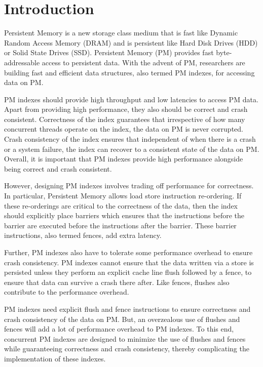 \section{Introduction}

Persistent Memory is a new storage class medium that is fast like Dynamic
Random Access Memory (DRAM) and is persistent like Hard Disk Drives (HDD) or
Solid State Drives (SSD). Persistent Memory (PM) provides fast
byte-addressable access to persistent data. With the advent of PM, researchers
are building fast and efficient data structures, also termed PM indexes, for
accessing data on PM.

PM indexes should provide high throughput and low latencies to access PM data.
Apart from providing high performance, they also should be correct and crash
consistent. Correctness of the index guarantees that irrespective of how many
concurrent threads operate on the index, the data on PM is never corrupted.
Crash consistency of the index ensures that independent of when there is a
crash or a system failure, the index can recover to a consistent state of the
data on PM. Overall, it is important that PM indexes provide high performance
alongside being correct and crash consistent.

However, designing PM indexes involves trading off performance for correctness.
In particular, Persistent Memory allows load store instruction re-ordering. If
these re-orderings are critical to the correctness of the data, then the index
should explicitly place barriers which ensures that the instructions before the
barrier are executed before the instructions after the barrier. These barrier
instructions, also termed fences, add extra latency.

Further, PM indexes also have to tolerate some performance overhead to ensure
crash consistency. PM indexes cannot ensure that the data written via a store
is persisted unless they perform an explicit cache line flush followed by a
fence, to ensure that data can survive a crash there after. Like fences, flushes
also contribute to the performance overhead.

PM indexes need explicit flush and fence instructions to ensure correctness and
crash consistency of the data on PM. But, an overzealous use of flushes and
fences will add a lot of performance overhead to PM indexes. To this end,
concurrent PM indexes are designed to minimize the use of flushes and fences
while guaranteeing correctness and crash consistency, thereby complicating
the implementation of these indexes.

